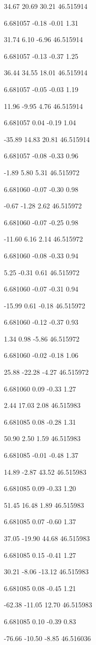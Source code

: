34.67
20.69
30.21
46.515914

6.681057
-0.18
-0.01
1.31

31.74
6.10
-6.96
46.515914

6.681057
-0.13
-0.37
1.25

36.44
34.55
18.01
46.515914

6.681057
-0.05
-0.03
1.19

11.96
-9.95
4.76
46.515914

6.681057
0.04
-0.19
1.04

-35.89
14.83
20.81
46.515914

6.681057
-0.08
-0.33
0.96

-1.89
5.80
5.31
46.515972

6.681060
-0.07
-0.30
0.98

-0.67
-1.28
2.62
46.515972

6.681060
-0.07
-0.25
0.98

-11.60
6.16
2.14
46.515972

6.681060
-0.08
-0.33
0.94

5.25
-0.31
0.61
46.515972

6.681060
-0.07
-0.31
0.94

-15.99
0.61
-0.18
46.515972

6.681060
-0.12
-0.37
0.93

1.34
0.98
-5.86
46.515972

6.681060
-0.02
-0.18
1.06

25.88
-22.28
-4.27
46.515972

6.681060
0.09
-0.33
1.27

2.44
17.03
2.08
46.515983

6.681085
0.08
-0.28
1.31

50.90
2.50
1.59
46.515983

6.681085
-0.01
-0.48
1.37

14.89
-2.87
43.52
46.515983

6.681085
0.09
-0.33
1.20

51.45
16.48
1.89
46.515983

6.681085
0.07
-0.60
1.37

37.05
-19.90
44.68
46.515983

6.681085
0.15
-0.41
1.27

30.21
-8.06
-13.12
46.515983

6.681085
0.08
-0.45
1.21

-62.38
-11.05
12.70
46.515983

6.681085
0.10
-0.39
0.83

-76.66
-10.50
-8.85
46.516036

